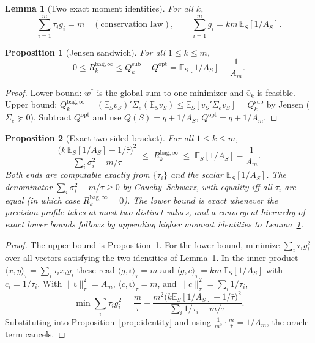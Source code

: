 \documentclass[11pt]{article}
\newcommand{\Sig}{\Sigma_e}
\newcommand{\E}{\mathbb{E}}
\newcommand{\Rk}{R_k^{\mathrm{bag},\infty}}
\newcommand{\Qsub}{Q_k^{\mathrm{sub}}}
\newcommand{\Qopt}{Q^{\mathrm{opt}}}
\newcommand{\iotab}{\bm{\iota}}
\newtheorem{lemma}{Lemma}
\newtheorem{proposition}{Proposition}
\begin{document}
\begin{lemma}[Two exact moment identities]\label{lem:moments}
For all $k$,
\[
  \sum_{i=1}^m\tau_i g_i=m\quad(\text{conservation law}),\qquad
  \sum_{i=1}^m g_i=km\,\E_S[1/A_S].
\]
\end{lemma}

\begin{proposition}[Jensen sandwich]\label{prop:jensen}
For all $1\le k\le m$,
\[
  0\le \Rk\le \Qsub-\Qopt=\E_S[1/A_S]-\frac1{A_m}.
\]
\end{proposition}
\begin{proof}
Lower bound: $w^\ast$ is the global sum-to-one minimizer and $\bar v_k$ is feasible.
Upper bound: $Q_k^{\mathrm{bag},\infty}=(\E_S v_S)'\Sig(\E_S v_S)\le\E_S[v_S'\Sig v_S]=\Qsub$
by Jensen ($\Sig\succeq0$). Subtract $\Qopt$ and use $Q(S)=q+1/A_S$, $\Qopt=q+1/A_m$.
\end{proof}

\begin{proposition}[Exact two-sided bracket]\label{prop:bracket}
For all $1\le k\le m$,
\[
  \frac{\big(k\,\E_S[1/A_S]-1/\bar\tau\big)^2}{\sum_i\sigma_i^2-m/\bar\tau}
  \;\le\;\Rk\;\le\;\E_S[1/A_S]-\frac1{A_m}.
\]
Both ends are computable exactly from $\{\tau_i\}$ and the scalar $\E_S[1/A_S]$. The
denominator $\sum_i\sigma_i^2-m/\bar\tau\ge0$ by Cauchy--Schwarz, with equality iff all
$\tau_i$ are equal (in which case $\Rk=0$). The lower bound is \emph{exact} whenever the
precision profile takes at most two distinct values, and a convergent hierarchy of exact
lower bounds follows by appending higher moment identities to Lemma~\ref{lem:moments}.
\end{proposition}
\begin{proof}
The upper bound is Proposition~\ref{prop:jensen}. For the lower bound, minimize
$\sum_i\tau_ig_i^2$ over all vectors satisfying the two identities of
Lemma~\ref{lem:moments}. In the inner product $\langle x,y\rangle_\tau=\sum_i\tau_ix_iy_i$
these read $\langle g,\iotab\rangle_\tau=m$ and $\langle g,c\rangle_\tau=km\,\E_S[1/A_S]$
with $c_i=1/\tau_i$. With $\|\iotab\|_\tau^2=A_m$, $\langle c,\iotab\rangle_\tau=m$, and
$\|c\|_\tau^2=\sum_i1/\tau_i$,
\[
  \min\sum_i\tau_ig_i^2=\frac{m}{\bar\tau}
  +\frac{m^2\big(k\E_S[1/A_S]-1/\bar\tau\big)^2}{\sum_i1/\tau_i-m/\bar\tau}.
\]
Substituting into Proposition~\ref{prop:identity} and using
$\tfrac1{m^2}\cdot\tfrac{m}{\bar\tau}=1/A_m$, the oracle term cancels.
\end{proof}
\end{document}
